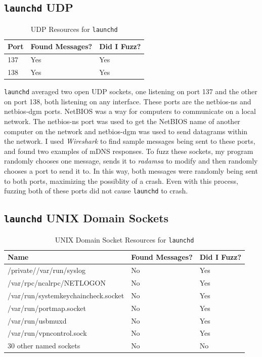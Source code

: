 \subsection{\texttt{launchd} UDP}
\label{sec:launchdUdp}

\begin{table}
\centering
\begin{normalsize}
\begin{tabular}{ l | l | l }
\textbf{Port} & \textbf{Found Messages?} & \textbf{Did I Fuzz?} \\ \hline
137 & Yes & Yes \\ \hline
138 & Yes & Yes \\ \hline
\end{tabular}
\caption{UDP Resources for \texttt{launchd}}
\label{tab:launchdUdp}
\end{normalsize}
\end{table} 

\texttt{launchd} averaged two open UDP sockets, one listening on port 137 and the other on port 138, both listening on any interface.  These ports are the netbios-ns and netbios-dgm ports.  NetBIOS was a way for computers to communicate on a local network.  The netbios-ns port was used to get the NetBIOS name of another computer on the network and netbios-dgm was used to send datagrams within the network.  I used \textit{Wireshark} to find sample messages being sent to these ports, and found two examples of mDNS responses.  To fuzz these sockets, my program randomly chooses one message, sends it to \textit{radamsa} to modify and then randomly chooses a port to send it to.  In this way, both messages were randomly being sent to both ports, maximizing the possiblity of a crash.  Even with this process, fuzzing both of these ports did not cause \texttt{launchd} to crash.

\subsection{\texttt{launchd} UNIX Domain Sockets}
\label{sec:launchdUnix}

\begin{table}
\centering
\begin{normalsize}
\begin{tabular}{ l | l | l }
\textbf{Name} & \textbf{Found Messages?} & \textbf{Did I Fuzz?} \\ \hline
/private//var/run/syslog & No & Yes \\ \hline
/var/rpc/ncalrpc/NETLOGON & No & Yes \\ \hline
/var/run/systemkeychaincheck.socket & No & Yes \\ \hline
/var/run/portmap.socket & No & Yes \\ \hline
/var/run/usbmuxd & No & Yes \\ \hline
/var/run/vpncontrol.sock & No & Yes \\ \hline
30 other named sockets & No & No \\ \hline
\end{tabular}
\caption{UNIX Domain Socket Resources for \texttt{launchd}}
\label{tab:launchdTcp}
\end{normalsize}
\end{table} 

